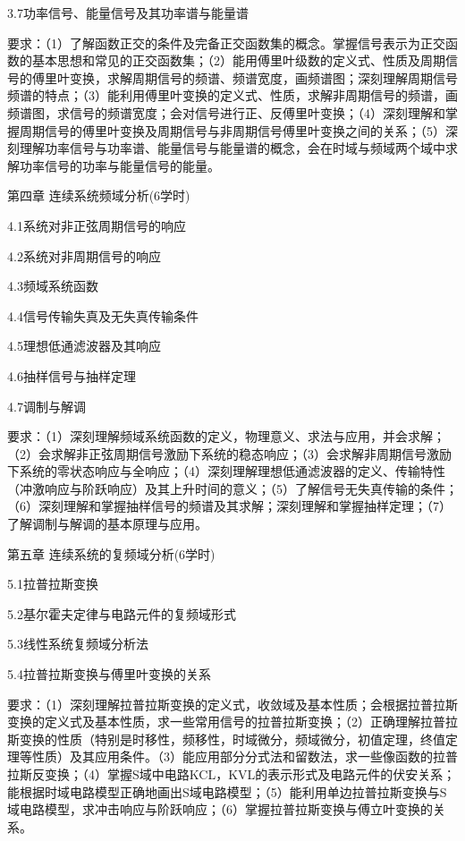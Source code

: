 \documentclass[letterpaper]{article}
\begin{document}
\quad\quad 3.7功率信号、能量信号及其功率谱与能量谱\par
\quad\quad 要求：（1）了解函数正交的条件及完备正交函数集的概念。掌握信号表示为正交函数的基本思想和常见的正交函数集；（2）能用傅里叶级数的定义式、性质及周期信号的傅里叶变换，求解周期信号的频谱、频谱宽度，画频谱图；深刻理解周期信号频谱的特点；（3）能利用傅里叶变换的定义式、性质，求解非周期信号的频谱，画频谱图，求信号的频谱宽度；会对信号进行正、反傅里叶变换；（4）深刻理解和掌握周期信号的傅里叶变换及周期信号与非周期信号傅里叶变换之间的关系；（5）深刻理解功率信号与功率谱、能量信号与能量谱的概念，会在时域与频域两个域中求解功率信号的功率与能量信号的能量。\par
\vspace{1em}
第四章 \quad\quad 连续系统频域分析(6学时)\par
\quad\quad 4.1系统对非正弦周期信号的响应\par
\quad\quad 4.2系统对非周期信号的响应\par
\quad\quad 4.3频域系统函数\par
\quad\quad 4.4信号传输失真及无失真传输条件\par
\quad\quad 4.5理想低通滤波器及其响应\par
\quad\quad 4.6抽样信号与抽样定理\par
\quad\quad 4.7调制与解调\par
\quad\quad 要求：（1）深刻理解频域系统函数的定义，物理意义、求法与应用，并会求解；（2）会求解非正弦周期信号激励下系统的稳态响应；（3）会求解非周期信号激励下系统的零状态响应与全响应；（4）深刻理解理想低通滤波器的定义、传输特性（冲激响应与阶跃响应）及其上升时间的意义；（5）了解信号无失真传输的条件；（6）深刻理解和掌握抽样信号的频谱及其求解；深刻理解和掌握抽样定理；（7）了解调制与解调的基本原理与应用。\par
\vspace{1em}
第五章 \quad 连续系统的复频域分析(6学时)\par
\quad\quad 5.1拉普拉斯变换 \par
\quad\quad 5.2基尔霍夫定律与电路元件的复频域形式\par
\quad\quad 5.3线性系统复频域分析法\par
\quad\quad 5.4拉普拉斯变换与傅里叶变换的关系\par
\quad\quad 要求：（1）深刻理解拉普拉斯变换的定义式，收敛域及基本性质；会根据拉普拉斯变换的定义式及基本性质，求一些常用信号的拉普拉斯变换；（2）正确理解拉普拉斯变换的性质（特别是时移性，频移性，时域微分，频域微分，初值定理，终值定理等性质）及其应用条件。（3）能应用部分分式法和留数法，求一些像函数的拉普拉斯反变换；（4）掌握S域中电路KCL，KVL的表示形式及电路元件的伏安关系；能根据时域电路模型正确地画出S域电路模型；（5）能利用单边拉普拉斯变换与S域电路模型，求冲击响应与阶跃响应；（6）掌握拉普拉斯变换与傅立叶变换的关系。\par
\end{document}
